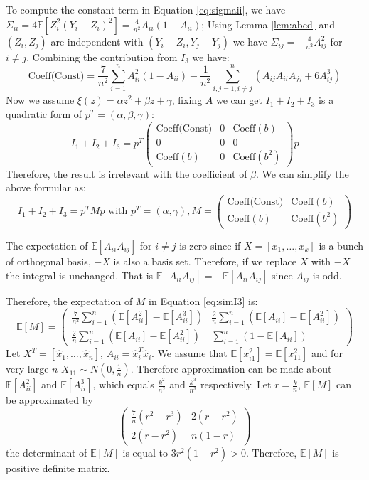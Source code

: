 \documentclass{article}
\def\E{\mathbb{E}}
\begin{document}
To compute the constant term in Equation \eqref{eq:sigmaii}, we have $\Sigma_{ii} = 4\E[Z_i^2 (Y_i-Z_i)^2] = \frac{4}{n^2} A_{ii}(1-A_{ii})$;
Using Lemma \ref{lem:abcd} and $(Z_i, Z_j)$ are independent with $(Y_i - Z_i, Y_j - Y_j)$ we have $\Sigma_{ij} = -\frac{4}{n^2} A_{ij}^2$ for $i \neq j$. Combining the contribution from $I_3$ we have:
\begin{equation}
\textrm{Coeff(Const)} = \frac{7}{n^2} \sum_{i=1}^n A^2_{ii} (1 -A_{ii}) - \frac{1}{n^2} \sum_{i,j=1,i\neq j}^n (A_{ij}A_{ii}A_{jj} + 6 A_{ij}^3)
\end{equation}
Now we assume $\xi(z) = \alpha z^2 + \beta z + \gamma$, fixing $A$ we can get $I_1 + I_2 + I_3$ is a quadratic form of $p^T = (\alpha, \beta, \gamma)$:
$$
I_1 + I_2 + I_3 =p^T \begin{pmatrix} 
\textrm{Coeff(Const)}  & 0 & \textrm{Coeff}(b) \\ 
0  & 0 & 0 \\ 
\textrm{Coeff}(b)   & 0 & \textrm{Coeff}(b^2) 
\end{pmatrix} p
$$
Therefore, the result is irrelevant with the coefficient of $\beta$.  We can simplify the above formular as:
\begin{equation}\label{eq:simI3}
I_1+I_2+I_3 = p^T M p \textrm{ with } p^T = (\alpha, \gamma), M = \begin{pmatrix} \textrm{Coeff(Const)}  &  \textrm{Coeff}(b) \\ \textrm{Coeff}(b) &  \textrm{Coeff}(b^2)  \end{pmatrix}
\end{equation}

The expectation of $\E[A_{ii} A_{ij}]$ for $i \neq j $ is zero since if $X= [x_1, \dots, x_k]$ is a bunch of orthogonal basis, $-X$ is also a basis set. Therefore, if we replace $X$ with $-X$ the integral is unchanged. That is $\E[A_{ii} A_{ij}] = -\E[A_{ii}A_{ij}]$ since $A_{ij}$ is odd. 

Therefore, the expectation of $M$ in Equation \ref{eq:simI3} is:
\begin{equation}\label{eq:2t2}
\E[M] = \begin{pmatrix} \frac{7}{n^2} \sum_{i=1}^n (\E[A_{ii}^2 ]-\E[A_{ii}^3]) & \frac{2}{n} \sum_{i=1}^n (\E[A_{ii}]-\E[A^2_{ii}]) \\
\frac{2}{n} \sum_{i=1}^n (\E[A_{ii}]-\E[A^2_{ii}]) & \sum_{i=1}^n (1-\E[A_{ii}])
 \end{pmatrix}
\end{equation}
Let $X^T=[\hat{x}_1, \dots, \hat{x}_n]$, $A_{ii}= \hat{x}_i^T \hat{x}_i$. We assume that $\E[x_{i1}^2] = \E[x_{11}^2]$ and for very large $n$ $X_{11} \sim N(0,\frac{1}{n})$. Therefore
approximation can be made about $\E[A_{ii}^2]$ and 
$\E[A_{ii}^3]$, which equals $\frac{k^2}{n^2}$ and $\frac{k^3}{n^3}$ respectively. Let $ r = \frac{k}{n}$, 
$\E[M] $ can be approximated by 
$$
\begin{pmatrix}
\frac{7}{n}(r^2 - r^3) & 2(r-r^2) \\
2(r-r^2) & n(1-r)
\end{pmatrix}
$$
the determinant of $\E[M]$ is equal to $3r^2(1-r^2) > 0 $. Therefore, $\E[M]$ is positive definite matrix.
\end{document}

